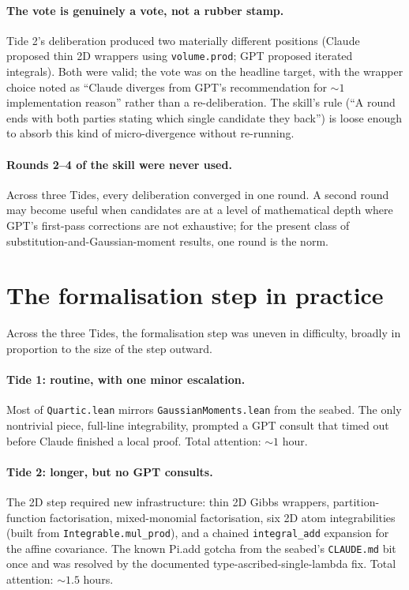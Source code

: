 \documentclass[11pt]{article}
\begin{document}
\paragraph{The vote is genuinely a vote, not a rubber stamp.} Tide 2's
deliberation produced two materially different positions (Claude
proposed thin 2D wrappers using \texttt{volume.prod}; GPT proposed
iterated integrals). Both were valid; the vote was on the headline
target, with the wrapper choice noted as ``Claude diverges from GPT's
recommendation for $\sim 1$ implementation reason'' rather than a
re-deliberation. The skill's rule (``A round ends with both parties
stating which single candidate they back'') is loose enough to absorb
this kind of micro-divergence without re-running.

\paragraph{Rounds 2--4 of the skill were never used.} Across three
Tides, every deliberation converged in one round. A second round may
become useful when candidates are at a level of mathematical depth
where GPT's first-pass corrections are not exhaustive; for the present
class of substitution-and-Gaussian-moment results, one round is the
norm.

\section{The formalisation step in practice}

Across the three Tides, the formalisation step was uneven in difficulty,
broadly in proportion to the size of the step outward.

\paragraph{Tide 1: routine, with one minor escalation.} Most of
\texttt{Quartic.lean} mirrors \texttt{GaussianMoments.lean} from the
seabed. The only nontrivial piece, full-line integrability, prompted a
GPT consult that timed out before Claude finished a local proof. Total
attention: $\sim 1$ hour.

\paragraph{Tide 2: longer, but no GPT consults.} The 2D step required
new infrastructure: thin 2D Gibbs wrappers, partition-function
factorisation, mixed-monomial factorisation, six 2D atom
integrabilities (built from \texttt{Integrable.mul\_prod}), and a
chained \texttt{integral\_add} expansion for the affine covariance.
The known Pi.add gotcha from the seabed's \texttt{CLAUDE.md} bit once
and was resolved by the documented type-ascribed-single-lambda fix.
Total attention: $\sim 1.5$ hours.
\end{document}

